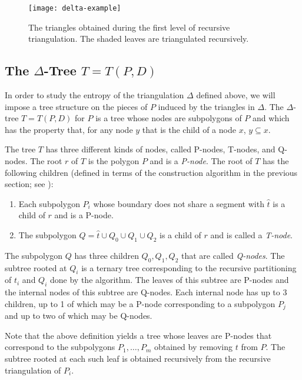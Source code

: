 \documentclass[acmtalg]{acmsmall}
\newcommand{\z}[1]{{\hat{#1}}}
\begin{document}
\begin{figure}
  \begin{center}
      \texttt{[image: delta-example]}
  \end{center}
  \caption{The triangles obtained during the first level of recursive
triangulation.  The shaded leaves are triangulated recursively.}
\end{figure}

\subsection{The $\Delta$-Tree $T=T(P,D)$}

In order to study the entropy of the triangulation $\Delta$ defined
above, we will impose a tree structure on the pieces of $P$ induced by
the triangles in $\Delta$.  The $\Delta$-tree $T=T(P,D)$ for $P$ is a
tree whose nodes are subpolygons of $P$ and which has the property
that, for any node $y$ that is the child of a node $x$, $y\subseteq
x$.

The tree $T$ has three different kinds of nodes, called P-nodes,
T-nodes, and Q-nodes.  The root $r$ of $T$ is the polygon $P$ and is
a \emph{P-node}.  The root of $T$ has the following children
(defined in terms of the construction algorithm in the previous
section; see ):

\begin{enumerate}
\item Each subpolygon $P_i$ whose boundary does not share a segment
      with $\z t$ is a child of $r$ and is a P-node.  
\item The subpolygon $Q=\z t\cup Q_0\cup Q_1\cup Q_2$ is a child of $r$ and is
called a \emph{T-node}.
\end{enumerate}

The subpolygon $Q$ has three children $Q_0,Q_1,Q_2$ that are called
\emph{Q-nodes}.  The subtree rooted at $Q_i$ is a ternary tree
corresponding to the recursive partitioning of $t_i$ and $Q_i$ done by
the algorithm. The leaves of this subtree are P-nodes and the internal
nodes of this subtree are Q-nodes.  Each internal node has up to 3
children, up to 1 of which may be a P-node corresponding to a
subpolygon $P_j$ and up to two of which may be Q-nodes.

Note that the above definition yields a tree whose leaves are P-nodes
that correspond to the subpolygons $P_1,\ldots,P_m$  obtained by
removing $t$ from $P$.  The subtree rooted at each such leaf is
obtained recursively from the recursive triangulation of $P_i$.
\end{document}
